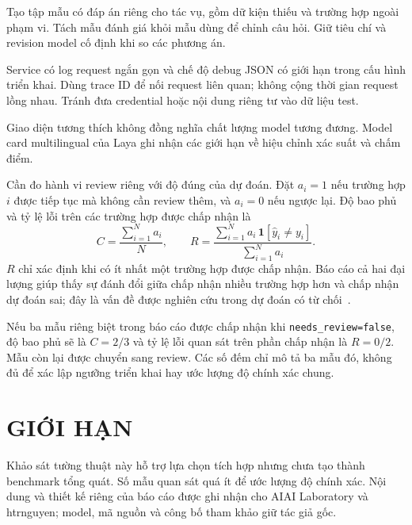 \documentclass[10pt,a4paper]{article}
\begin{document}
Tạo tập mẫu có đáp án riêng cho tác vụ, gồm dữ kiện thiếu và trường hợp ngoài phạm vi. Tách mẫu đánh giá khỏi mẫu dùng để chỉnh câu hỏi. Giữ tiêu chí và revision model cố định khi so các phương án.

Service có log request ngắn gọn và chế độ debug JSON có giới hạn trong cấu hình triển khai. Dùng trace ID để nối request liên quan; không cộng thời gian request lồng nhau. Tránh đưa credential hoặc nội dung riêng tư vào dữ liệu test.

Giao diện tương thích không đồng nghĩa chất lượng model tương đương. Model card multilingual của Laya ghi nhận các giới hạn về hiệu chỉnh xác suất và chấm điểm. \cite{r3}


Cần đo hành vi review riêng với độ đúng của dự đoán. Đặt $a_i=1$ nếu trường hợp $i$ được tiếp tục mà không cần review thêm, và $a_i=0$ nếu ngược lại. Độ bao phủ và tỷ lệ lỗi trên các trường hợp được chấp nhận là
\begin{equation}
 C=\frac{\sum_{i=1}^{N}a_i}{N},
 \qquad R=\frac{\sum_{i=1}^{N}a_i\,\mathbf{1}[\hat{y}_i\ne y_i]}{\sum_{i=1}^{N}a_i}.
 \label{eq:coverage}
\end{equation}
$R$ chỉ xác định khi có ít nhất một trường hợp được chấp nhận. Báo cáo cả hai đại lượng giúp thấy sự đánh đổi giữa chấp nhận nhiều trường hợp hơn và chấp nhận dự đoán sai; đây là vấn đề được nghiên cứu trong dự đoán có từ chối~\cite{r9}.

Nếu ba mẫu riêng biệt trong báo cáo được chấp nhận khi \texttt{needs\_review=false}, độ bao phủ sẽ là $C=2/3$ và tỷ lệ lỗi quan sát trên phần chấp nhận là $R=0/2$. Mẫu còn lại được chuyển sang review. Các số đếm chỉ mô tả ba mẫu đó, không đủ để xác lập ngưỡng triển khai hay ước lượng độ chính xác chung.

\section{GIỚI HẠN}
Khảo sát tường thuật này hỗ trợ lựa chọn tích hợp nhưng chưa tạo thành benchmark tổng quát. Số mẫu quan sát quá ít để ước lượng độ chính xác. Nội dung và thiết kế riêng của báo cáo được ghi nhận cho AIAI Laboratory và htrnguyen; model, mã nguồn và công bố tham khảo giữ tác giả gốc.
\clearpage

\end{document}

